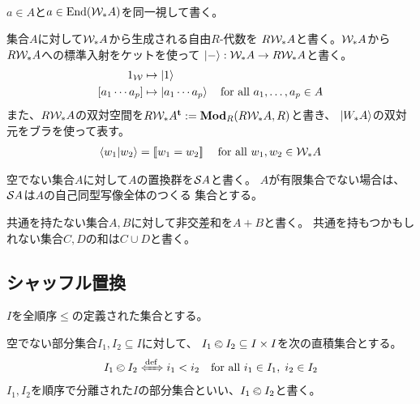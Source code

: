 {\begin{description}
\begin{equation*}
\begin{split}
		\end{split}\end{equation*}
		$a\in A$と$a\in \End(\W_*A)$を同一視して書く。
		\item[自由代数] 集合$A$に対して$\W_*A$から生成される自由$R$-代数を
		$R\W_*A$と書く。$\W_*A$から$R\W_*A$への標準入射をケットを使って
		$\ket{-}:\W_*A\to R\W_*A$と書く。
		\begin{equation*}\begin{split}
				1_\W &\mapsto \ket{1} \\
				[a_1\cdots a_p] &\mapsto \ket{a_1\cdots a_p}
				\quad\text{for all } a_1,\dots,a_p\in A
		\end{split}\end{equation*}
		また、$R\W_*A$の双対空間を$R\W_*A^\tran:=\Mod[R](R\W_*A,R)$と書き、
		$\ket{W_*A}$の双対元をブラを使って表す。
		\begin{equation*}\begin{split}
			\braket{w_1|w_2} = \jump{w_1 = w_2}
			\quad\text{for all } w_1,w_2\in \W_*A
		\end{split}\end{equation*}
		\item[置換群] 空でない集合$A$に対して$A$の置換群を$\Perm A$と書く。
		$A$が有限集合でない場合は、$\Perm A$は$A$の自己同型写像全体のつくる
		集合とする。
		\item[非交差和] 共通を持たない集合$A,B$に対して非交差和を$A+B$と書く。
		共通を持もつかもしれない集合$C,D$の和は$C\cup D$と書く。
	\end{description} %

\subsection{シャッフル置換}\label{s2:シャッフル置換} %
	$I$を全順序$\le$の定義された集合とする。

	\begin{definition}[順序で分離された部分集合]
	\label{def:順序で分離された部分集合} %
		空でない部分集合$I_1,I_2\subseteq I$に対して、
		$I_1\oless I_2\subseteq I\times I$を次の直積集合とする。
		\begin{equation*}\begin{split}
			I_1\oless I_2 \xiff{\dfn} 
				i_1 < i_2 \quad\text{for all } i_1\in I_1,\; i_2\in I_2
		\end{split}\end{equation*}
		$I_1,I_2$を順序で分離された$I$の部分集合といい、$I_1\oless I_2$と書く。
	\end{definition} %

}
